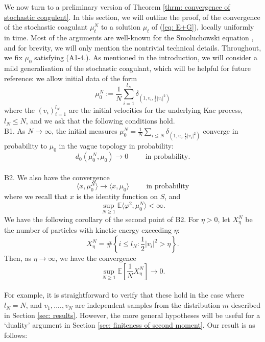 \documentclass[11pt, notitlepage]{article}
\newcommand{\EE}{\ensuremath{\mathbb{E}}}
\newcommand{\abs}[1]{\left\lvert{#1}\right\rvert}
\begin{document}
We now turn to a preliminary version of Theorem \ref{thrm: convergence of stochastic coagulent}.
In this section, we will outline the proof, of the convergence of the stochastic coagulant $\mu^N_t$ to a solution $\mu_t$ of (\ref{eq: E+G}), locally uniformly in time. Most of the arguments are well-known for the Smoluchowski equation \cite{N99,N00}, and for brevity, we will only mention the nontrivial technical details. Throughout, we fix $\mu_0$ satisfying (A1-4.). As mentioned in the introduction, we will consider a mild generalisation of the stochastic coagulant, which will be helpful for future reference: we allow initial data of the form 
\begin{equation}
    \mu^N_0 := \frac1N \sum_{i=1}^{l_N} \delta_{\left(1,v_i, \frac12 \abs{v_i}^2\right)}
\end{equation}
where the $(v_i)_{i=1}^{l_N}$ are the initial velocities for the underlying Kac process, $l_N\le N$, and we ask that the following conditions hold.
\\B1. As $N\rightarrow \infty$, the initial measures $\mu^N_0=\frac1N\sum_{i\le N}\delta_{(1,v_i,\frac{1}{2}|v_i|^2)}$ converge in probability to $\mu_0$ in the vague topology in probability: \begin{equation}d_0(\mu^N_0, \mu_0)\rightarrow 0 \hspace{1cm}\text{in probability}. \end{equation} 
\\B2. We also have the convergence \begin{equation} \langle x, \mu^N_0\rangle \rightarrow \langle x, \mu_0\rangle \hspace{1cm} \text{in probability}\end{equation} where we recall that $x$ is the identity function on $S$, and \begin{equation} \sup_{N\ge 1} \EE\langle \varphi^2, \mu^N_0\rangle <\infty. \end{equation}
We have the following corollary of the second point of B2. For $\eta>0$, let $X^N_\eta$ be the number of particles with kinetic energy exceeding $\eta:$ \begin{equation}
    X^N_\eta= \#\left\{i\le l_N: \frac{1}{2}|v_i|^2>\eta\right\}.
\end{equation}Then, as $\eta\rightarrow \infty$, we have the convergence \begin{equation}\label{eq: b3} \sup_{N\ge 1} \mathbb{E}\left[\frac{1}{N}X^N_\eta\right]\rightarrow 0. \end{equation} \medskip \\ For example, it is straightforward to verify that these hold in the case where $l_N=N$, and $v_1,....,v_N$ are independent samples from the distribution $m$ described in Section \ref{sec: results}. However, the more general hypotheses will be useful for a `duality' argument in Section \ref{sec: finiteness of second moment}. Our result is as follows:
\end{document}

